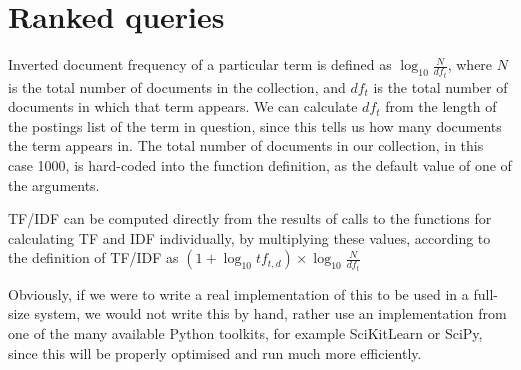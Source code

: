 \documentclass{article}
\begin{document}
\section{Ranked queries}
Inverted document frequency of a particular term is defined as $\log_10 \frac{N}{df_t}$, where $N$ is the total number of documents in the collection, and $df_t$ is the total number of documents in which that term appears. We can calculate $df_t$ from the length of the postings list of the term in question, since this tells us how many documents the term appears in. The total number of documents in our collection, in this case 1000, is hard-coded into the function definition, as the default value of one of the arguments. 


TF/IDF can be computed directly from the results of calls to the functions for calculating TF and IDF individually, by multiplying these values, according to the definition of TF/IDF as $(1+ \log_10 tf_{t,d})\times \log_10 \frac{N}{df_t}$



Obviously, if we were to write a real implementation of this to be used in a full-size system, we would not write this by hand, rather use an implementation from one of the many available Python toolkits, for example SciKitLearn or SciPy, since this will be properly optimised and run much more efficiently. 
\end{document}
